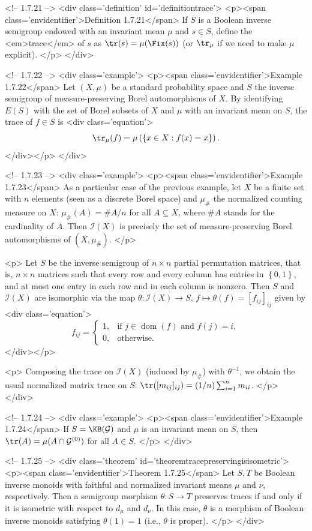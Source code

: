 <!-- 1.7.21 -->
<div class='definition' id='definitiontrace'>
<p><span class='envidentifier'>Definition 1.7.21</span>
If $S$ is a Boolean inverse semigroup endowed with an invariant mean $\mu$ and $s\in S$, define the <em>trace</em> of $s$ as $\tr(s)=\mu(\Fix(s))$ (or $\tr_\mu$ if we need to make $\mu$ explicit).
</p>
</div>

<!-- 1.7.22 -->
<div class='example'>
	<p><span class='envidentifier'>Example 1.7.22</span>
	Let $(X,\mu)$ be a standard probability space and $S$ the inverse semigroup of measure-preserving Borel automorphisms of $X$. By identifying $E(S)$ with the set of Borel subsets of $X$ and $\mu$ with an invariant mean on $S$, the trace of $f\in S$ is
	<div class='equation'>\[
	\tr_\mu(f)=\mu\left(\left\{x\in X:f(x)=x\right\}\right).
	\]</div></p>
</div>

<!-- 1.7.23 -->
<div class='example'>
	<p><span class='envidentifier'>Example 1.7.23</span>
	As a particular case of the previous example, let $X$ be a finite set with $n$ elements (seen as a discrete Borel space) and $\mu_\#$ the normalized counting measure on $X$: $\mu_\#(A)=\#A/n$ for all $A\subseteq X$, where $\#A$ stands for the cardinality of $A$. Then $\mathcal{I}(X)$ is precisely the set of measure-preserving Borel automorphisms of $(X,\mu_\#)$.
	</p>

	<p>
	Let $S$ be the inverse semigroup of $n\times n$ partial permutation matrices, that is, $n\times n$ matrices such that every row and every column has entries in $\left\{0,1\right\}$, and at most one entry in each row and in each column is nonzero. Then $S$ and $\mathcal{I}(X)$ are isomorphic via the map $\theta:\mathcal{I}(X)\to S$, $f\mapsto\theta(f)=[f_{ij}]_{ij}$ given by
	<div class='equation'>\[
	f_{ij}=\begin{cases}
	1,&\text{if }j\in\operatorname{dom}(f)\text{ and }f(j)=i,\\
	0,&\text{otherwise.}
	\end{cases}
	\]</div></p>

	<p>
	Composing the trace on $\mathcal{I}(X)$ (induced by $\mu_\#$) with $\theta^{-1}$, we obtain the usual normalized matrix trace on $S$: $\tr([m_{ij}]_{ij})=(1/n)\sum_{i=1}^n m_{ii}$.
	</p>
</div>

<!-- 1.7.24 -->
<div class='example'>
	<p><span class='envidentifier'>Example 1.7.24</span>
	If $S=\KB(\mathcal{G})$ and $\mu$ is an invariant mean on $S$, then $\tr(A)=\mu(A\cap\mathcal{G}^{(0)})$ for all $A\in S$.
	</p>
</div>

<!-- 1.7.25 -->
<div class='theorem' id='theoremtracepreservingisisometric'>
	<p><span class='envidentifier'>Theorem 1.7.25</span>
	Let $S,T$ be Boolean inverse monoids with faithful and normalized invariant means $\mu$ and $\nu$, respectively. Then a semigroup morphism $\theta:S\to T$ preserves traces if and only if it is isometric with respect to $d_\mu$ and $d_\nu$. In this case, $\theta$ is a morphism of Boolean inverse monoids satisfying $\theta(1)=1$ (i.e., $\theta$ is proper).
	</p>
</div>


